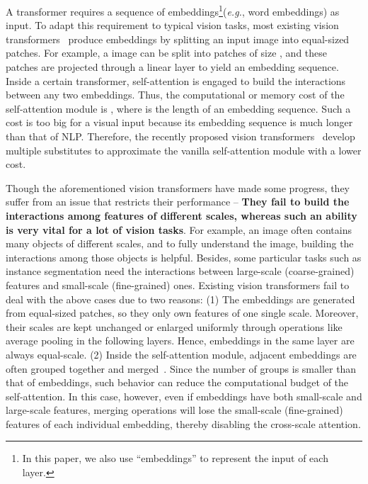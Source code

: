 \documentclass{article} \usepackage{iclr2022_conference,times}
\newcommand{\eg}{{\emph{e.g.}}}
\begin{document}
A transformer requires a sequence of embeddings\footnote{In this paper, we also use ``embeddings'' to represent the input of each layer.}(\eg, word embeddings) as input. To adapt this requirement to typical vision tasks, most existing vision transformers~\citep{DBLP:conf/iclr/DosovitskiyB0WZ21,DBLP:conf/icml/TouvronCDMSJ21,DBLP:journals/corr/abs-2102-12122,DBLP:journals/corr/abs-2103-14030} produce embeddings by splitting an input image into equal-sized patches.
For example, a  image can be split into  patches of size , and these patches are projected through a linear layer to yield an embedding sequence.
Inside a certain transformer, self-attention is engaged to build the interactions between any two embeddings.
Thus, the computational or memory cost of the self-attention module is , where  is the length of an embedding sequence. Such a cost is too big for a visual input because its embedding sequence is much longer than that of NLP. Therefore, the recently proposed vision transformers~\citep{DBLP:journals/corr/abs-2102-12122,DBLP:journals/corr/abs-2103-14030,DBLP:journals/corr/abs-2106-05786} develop multiple substitutes to approximate the vanilla self-attention module with a lower cost.

Though the aforementioned vision transformers have made some progress, they suffer from an issue that restricts their performance -- \textbf{They fail to build the interactions among features of different scales, whereas such an ability is very vital for a lot of vision tasks}. For example, an image often contains many objects of different scales, and to fully understand the image, building the interactions among those objects is helpful. Besides, some particular tasks such as instance segmentation need the interactions between large-scale (coarse-grained) features and small-scale (fine-grained) ones. Existing vision transformers fail to deal with the above cases due to two reasons:
(1) The embeddings are generated from equal-sized patches, so they only own features of one single scale. Moreover, their scales are kept unchanged or enlarged uniformly through operations like average pooling in the following layers. Hence, embeddings in the same layer are always equal-scale.
(2) Inside the self-attention module, adjacent embeddings are often grouped together and merged~\citep{DBLP:journals/corr/abs-2102-12122,DBLP:journals/corr/abs-2104-13840}. Since the number of groups is smaller than that of embeddings, such behavior can reduce the computational budget of the self-attention.
In this case, however, even if embeddings have both small-scale and large-scale features, merging operations will lose the small-scale (fine-grained) features of each individual embedding, thereby disabling the cross-scale attention.
\end{document}
